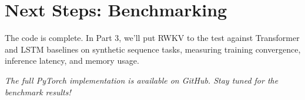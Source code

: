 \documentclass[12pt]{article}
\begin{document}
\section*{Next Steps: Benchmarking}

The code is complete. In Part 3, we'll put RWKV to the test against Transformer and LSTM baselines on synthetic sequence tasks, measuring training convergence, inference latency, and memory usage.

\vspace{1em}
\noindent \textit{The full PyTorch implementation is available on GitHub. Stay tuned for the benchmark results!}
\end{document}
